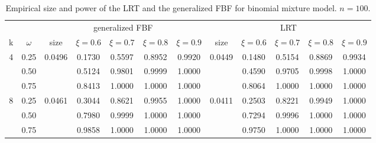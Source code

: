 \documentclass[11pt]{article}
\theoremstyle{plain}
\theoremstyle{definition}
\theoremstyle{remark}
\begin{document}
\begin{table}[ht]
    \caption{Empirical size and power of the LRT and the generalized FBF for binomial mixture model. $n=100$.}
    \label{binomial_table2}
    \small
    \centering
    \begin{tabular}{cccccccccccc}
        \toprule
         & & \multicolumn{5}{c}{generalized FBF} &\multicolumn{5}{c}{LRT}\\
        \cmidrule(r){3-7}\cmidrule(r){8-12}
        k & $\omega$ 
        & size & $\xi= 0.6$& $\xi= 0.7$& $\xi= 0.8$& $\xi= 0.9$   
        & size & $\xi= 0.6$& $\xi= 0.7$& $\xi= 0.8$& $\xi= 0.9$
        \\ 
        \midrule
        4 &0.25 & 0.0496& 0.1730& 0.5597& 0.8952 & 0.9920 & 0.0449& 0.1480& 0.5154 & 0.8869 &0.9934 \\
        &0.50   &       & 0.5124& 0.9801& 0.9999 & 1.0000 &       &0.4590 & 0.9705 & 0.9998 & 1.0000 \\
        &0.75 &         &0.8413 & 1.0000& 1.0000 &1.0000&         &0.8064 & 1.0000 & 1.0000 & 1.0000 \\
        \midrule
        8 &0.25 & 0.0461& 0.3044& 0.8621& 0.9955 & 1.0000 & 0.0411& 0.2503 & 0.8221 & 0.9949 &1.0000\\
        &0.50   &       & 0.7980& 0.9999& 1.0000 & 1.0000 &       & 0.7294 & 0.9996 & 1.0000 &1.0000\\
        &0.75   &       & 0.9858& 1.0000& 1.0000 & 1.0000 &       & 0.9750 & 1.0000 & 1.0000 &1.0000\\
        \bottomrule

    \end{tabular}

\end{table}
\end{document}
